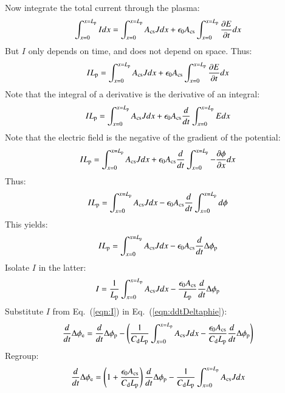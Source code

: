 \documentclass{warpdoc}
\begin{document}
Now integrate the total current through the plasma:
%
\begin{equation}
  \int_{x=0}^{x=L_{\rm p}} I dx=\int_{x=0}^{x=L_{\rm p}} A_{\rm cs} J dx + \epsilon_0 A_{\rm cs} \int_{x=0}^{x=L_{\rm p}} \frac{\partial E}{\partial t}  dx
\end{equation}
%
But $I$ only depends on time, and does not depend on space. Thus:
%
\begin{equation}
  I L_{\rm p}=\int_{x=0}^{x=L_{\rm p}} A_{\rm cs} J dx + \epsilon_0 A_{\rm cs} \int_{x=0}^{x=L_{\rm p}} \frac{\partial E}{\partial t}  dx
\end{equation}
%
Note that the integral of a derivative is the derivative of an integral:
%
\begin{equation}
  I L_{\rm p}=\int_{x=0}^{x=L_{\rm p}} A_{\rm cs} J dx + \epsilon_0 A_{\rm cs} \frac{d }{d t} \int_{x=0}^{x=L_{\rm p}} E  dx
\end{equation}
%
Note that the electric field is the negative of the gradient of the potential:
%
\begin{equation}
  I L_{\rm p}=\int_{x=0}^{x=L_{\rm p}} A_{\rm cs} J dx + \epsilon_0 A_{\rm cs} \frac{d }{d t} \int_{x=0}^{x=L_{\rm p}} -\frac{\partial \phi}{\partial x}  dx
\end{equation}
%
Thus:
%
\begin{equation}
  I L_{\rm p}=\int_{x=0}^{x=L_{\rm p}} A_{\rm cs} J dx - \epsilon_0 A_{\rm cs} \frac{d }{d t} \int_{x=0}^{x=L_{\rm p}} d \phi
\end{equation}
%
This yields:
%
\begin{equation}
  I L_{\rm p}=\int_{x=0}^{x=L_{\rm p}} A_{\rm cs} J dx - \epsilon_0 A_{\rm cs} \frac{d }{d t}  \Delta \phi_{\rm p}
\end{equation}
%
Isolate $I$ in the latter:
%
\begin{equation}
  I =\frac{1}{L_{\rm p}}\int_{x=0}^{x=L_{\rm p}} A_{\rm cs} J dx - \frac{\epsilon_0 A_{\rm cs}}{L_{\rm p}} \frac{d }{d t}  \Delta \phi_{\rm p}
\label{eqn:I}
\end{equation}
%
Substitute $I$ from Eq.\ (\ref{eqn:I}) in Eq.\ (\ref{eqn:ddtDeltaphie}):
%
\begin{equation}
\frac{d}{d t}\Delta \phi_{\rm e} = \frac{d}{d t}\Delta \phi_{\rm p}- \left(\frac{1}{C_{\rm d} L_{\rm p}}\int_{x=0}^{x=L_{\rm p}} A_{\rm cs} J dx - \frac{\epsilon_0 A_{\rm cs}}{C_{\rm d} L_{\rm p}} \frac{d }{d t}  \Delta \phi_{\rm p} \right)
\end{equation}
% 
Regroup:
%
\begin{equation}
\frac{d}{d t}\Delta \phi_{\rm e} = \left(1+\frac{\epsilon_0 A_{\rm cs}}{C_{\rm d} L_{\rm p}} \right)\frac{d}{d t}\Delta \phi_{\rm p}- \frac{1}{C_{\rm d} L_{\rm p}}\int_{x=0}^{x=L_{\rm p}} A_{\rm cs} J dx  
\end{equation}
\end{document}
